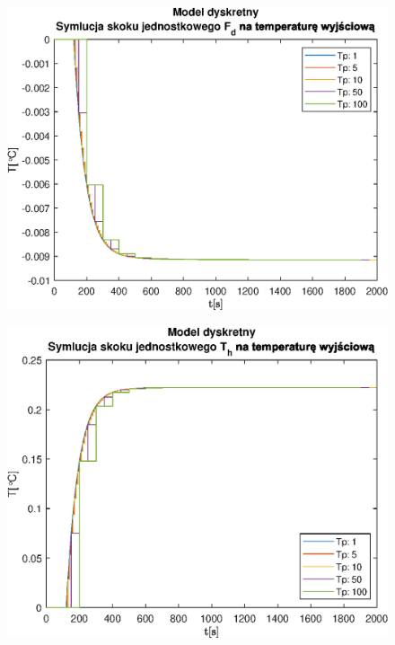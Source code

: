 \begin{figure}[h!]
   \centering
   \includegraphics{img/discrete-step-responses/FdT.eps}
   \caption{}
   \label{}
\end{figure}
            
\begin{figure}[h!]
   \centering
   \includegraphics{img/discrete-step-responses/ThT.eps}
   \caption{}
   \label{}
\end{figure}
            
